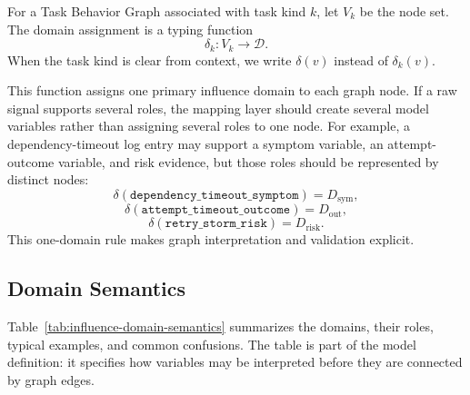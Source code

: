 For a Task Behavior Graph associated with task kind $k$, let $V_k$ be the node
set. The domain assignment is a typing function
\[
\delta_k : V_k \rightarrow \mathcal{D}.
\]
When the task kind is clear from context, we write $\delta(v)$ instead of
$\delta_k(v)$.

This function assigns one primary influence domain to each graph node. If a raw
signal supports several roles, the mapping layer should create several model
variables rather than assigning several roles to one node. For example, a
dependency-timeout log entry may support a symptom variable, an attempt-outcome
variable, and risk evidence, but those roles should be represented by distinct
nodes:
\[
\delta(\texttt{dependency\_timeout\_symptom}) = D_{\mathrm{sym}},
\]
\[
\delta(\texttt{attempt\_timeout\_outcome}) = D_{\mathrm{out}},
\]
\[
\delta(\texttt{retry\_storm\_risk}) = D_{\mathrm{risk}}.
\]
This one-domain rule makes graph interpretation and validation explicit.

\subsection{Domain Semantics}
\label{sec:influence-domain-semantics}

Table~\ref{tab:influence-domain-semantics} summarizes the domains, their roles,
typical examples, and common confusions. The table is part of the model
definition: it specifies how variables may be interpreted before they are
connected by graph edges.

\begingroup
\renewcommand{\arraystretch}{1.18}
\setlength{\tabcolsep}{4pt}


